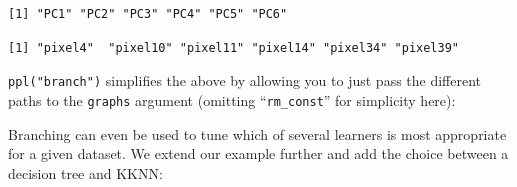 \begin{Shaded}
\begin{Highlighting}[]
\SpecialCharTok{$}\SpecialCharTok{$}\SpecialCharTok{$}\OtherTok{=} 
\SpecialCharTok{$}\NormalTok{(tsk\_mnist)[[}\NormalTok{]]}\SpecialCharTok{$}
\end{Highlighting}
\end{Shaded}

\begin{verbatim}
[1] "PC1" "PC2" "PC3" "PC4" "PC5" "PC6"
\end{verbatim}

\begin{Shaded}
\begin{Highlighting}[]
\SpecialCharTok{$}\SpecialCharTok{$}\SpecialCharTok{$}\OtherTok{=} 
\SpecialCharTok{$}\NormalTok{(tsk\_mnist)[[}\NormalTok{]]}\SpecialCharTok{$}
\end{Highlighting}
\end{Shaded}

\begin{verbatim}
[1] "pixel4"  "pixel10" "pixel11" "pixel14" "pixel34" "pixel39"
\end{verbatim}

\texttt{ppl("branch")} simplifies the above by allowing you to just pass
the different paths to the \texttt{graphs} argument (omitting
``\texttt{rm\_const}'' for simplicity here):

\begin{Shaded}
\begin{Highlighting}[]
\NormalTok{(}\NormalTok{, } \NormalTok{(}\NormalTok{(}\NormalTok{, }\NormalTok{, }\NormalTok{)))}
\end{Highlighting}
\end{Shaded}

Branching can even be used to tune which of several learners is most
appropriate for a given dataset. We extend our example further and add
the choice between a decision tree and KKNN:

